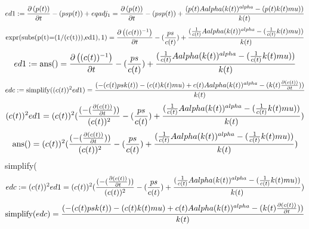 \documentclass{article}
\begin{document}
\begin{equation} \label{eq:16}
ed1:=\frac{\partial \left(p(t)\right)}{\partial t}-(ps\* p(t))+eqadj_1 = \frac{\partial \left(p(t)\right)}{\partial t}-(ps\* p(t))+\frac{(p(t)\* A\* alpha\* (k(t))^{alpha}-(p(t)\* k(t)\* mu))}{k(t)}
\end{equation}
\begin{equation} \label{eq:17}
\mbox{expr}(\mbox{subs(p(t)=(1/(c(t))),ed1)},1) = \frac{\partial \left((c(t))^{-1}\right)}{\partial t}-(\frac{ps}{c(t)})+\frac{(\frac{1}{c(t)} \* A\* alpha\* (k(t))^{alpha}-(\frac{1}{c(t)} \* k(t)\* mu))}{k(t)}
\end{equation}
\begin{equation} \label{eq:18}
ed1:=\mbox{ans()} = \frac{\partial \left((c(t))^{-1}\right)}{\partial t}-(\frac{ps}{c(t)})+\frac{(\frac{1}{c(t)} \* A\* alpha\* (k(t))^{alpha}-(\frac{1}{c(t)} \* k(t)\* mu))}{k(t)}
\end{equation}
\begin{equation} \label{eq:19}
edc:=\mbox{simplify}((c(t))^{2}\* ed1) = \frac{(-(c(t)\* ps\* k(t))-(c(t)\* k(t)\* mu)+c(t)\* A\* alpha\* (k(t))^{alpha}-(k(t)\* \frac{\partial \left(c(t)\right)}{\partial t}))}{k(t)}
\end{equation}
\begin{equation} \label{eq:20}
(c(t))^{2}\* ed1 = (c(t))^{2}\* (\frac{(-(\frac{\partial \left(c(t)\right)}{\partial t}))}{(c(t))^{2}}-(\frac{ps}{c(t)})+\frac{(\frac{1}{c(t)} \* A\* alpha\* (k(t))^{alpha}-(\frac{1}{c(t)} \* k(t)\* mu))}{k(t)})
\end{equation}
\begin{equation} \label{eq:21}
\mbox{ans()} = (c(t))^{2}\* (\frac{(-(\frac{\partial \left(c(t)\right)}{\partial t}))}{(c(t))^{2}}-(\frac{ps}{c(t)})+\frac{(\frac{1}{c(t)} \* A\* alpha\* (k(t))^{alpha}-(\frac{1}{c(t)} \* k(t)\* mu))}{k(t)})
\end{equation}
simplify(%
\begin{equation} \label{eq:23}
edc:=(c(t))^{2}\* ed1 = (c(t))^{2}\* (\frac{(-(\frac{\partial \left(c(t)\right)}{\partial t}))}{(c(t))^{2}}-(\frac{ps}{c(t)})+\frac{(\frac{1}{c(t)} \* A\* alpha\* (k(t))^{alpha}-(\frac{1}{c(t)} \* k(t)\* mu))}{k(t)})
\end{equation}
\begin{equation} \label{eq:24}
\mbox{simplify}(edc) = \frac{(-(c(t)\* ps\* k(t))-(c(t)\* k(t)\* mu)+c(t)\* A\* alpha\* (k(t))^{alpha}-(k(t)\* \frac{\partial \left(c(t)\right)}{\partial t}))}{k(t)}
\end{equation}
\end{document}
